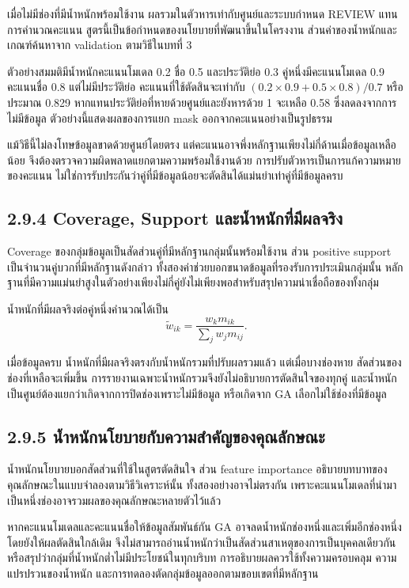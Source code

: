 เมื่อไม่มีช่องที่มีน้ำหนักพร้อมใช้งาน ผลรวมในตัวหารเท่ากับศูนย์และระบบกำหนด REVIEW แทนการคำนวณคะแนน สูตรนี้เป็นข้อกำหนดของนโยบายที่พัฒนาขึ้นในโครงงาน ส่วนค่าของน้ำหนักและเกณฑ์ค้นหาจาก validation ตามวิธีในบทที่ 3

ตัวอย่างสมมติมีน้ำหนักคะแนนโมเดล 0.2 ชื่อ 0.5 และประวัติย่อ 0.3 คู่หนึ่งมีคะแนนโมเดล 0.9 คะแนนชื่อ 0.8 แต่ไม่มีประวัติย่อ คะแนนที่ใช้ตัดสินจะเท่ากับ $(0.2\times0.9+0.5\times0.8)/0.7$ หรือประมาณ 0.829 หากแทนประวัติย่อที่หายด้วยศูนย์และยังหารด้วย 1 จะเหลือ 0.58 ซึ่งลดลงจากการไม่มีข้อมูล ตัวอย่างนี้แสดงผลของการแยก mask ออกจากคะแนนอย่างเป็นรูปธรรม

แม้วิธีนี้ไม่ลงโทษข้อมูลขาดด้วยศูนย์โดยตรง แต่คะแนนอาจพึ่งหลักฐานเพียงไม่กี่ด้านเมื่อข้อมูลเหลือน้อย จึงต้องตรวจความผิดพลาดแยกตามความพร้อมใช้งานด้วย การปรับตัวหารเป็นการแก้ความหมายของคะแนน ไม่ใช่การรับประกันว่าคู่ที่มีข้อมูลน้อยจะตัดสินได้แม่นยำเท่าคู่ที่มีข้อมูลครบ

\subsection*{2.9.4 Coverage, Support และน้ำหนักที่มีผลจริง}
Coverage ของกลุ่มข้อมูลเป็นสัดส่วนคู่ที่มีหลักฐานกลุ่มนั้นพร้อมใช้งาน ส่วน positive support เป็นจำนวนคู่บวกที่มีหลักฐานดังกล่าว ทั้งสองค่าช่วยบอกขนาดข้อมูลที่รองรับการประเมินกลุ่มนั้น หลักฐานที่มีความแม่นยำสูงในตัวอย่างเพียงไม่กี่คู่ยังไม่เพียงพอสำหรับสรุปความน่าเชื่อถือของทั้งกลุ่ม

น้ำหนักที่มีผลจริงต่อคู่หนึ่งคำนวณได้เป็น
\begin{equation*}
\widetilde{w}_{ik}=\frac{w_km_{ik}}{\sum_jw_jm_{ij}}.
\end{equation*}

เมื่อข้อมูลครบ น้ำหนักที่มีผลจริงตรงกับน้ำหนักรวมที่ปรับผลรวมแล้ว แต่เมื่อบางช่องหาย สัดส่วนของช่องที่เหลือจะเพิ่มขึ้น การรายงานเฉพาะน้ำหนักรวมจึงยังไม่อธิบายการตัดสินใจของทุกคู่ และน้ำหนักเป็นศูนย์ต้องแยกว่าเกิดจากการปิดช่องเพราะไม่มีข้อมูล หรือเกิดจาก GA เลือกไม่ใช้ช่องที่มีข้อมูล

\subsection*{2.9.5 น้ำหนักนโยบายกับความสำคัญของคุณลักษณะ}
น้ำหนักนโยบายบอกสัดส่วนที่ใช้ในสูตรตัดสินใจ ส่วน feature importance อธิบายบทบาทของคุณลักษณะในแบบจำลองตามวิธีวิเคราะห์นั้น ทั้งสองอย่างอาจไม่ตรงกัน เพราะคะแนนโมเดลที่นำมาเป็นหนึ่งช่องอาจรวมผลของคุณลักษณะหลายตัวไว้แล้ว

หากคะแนนโมเดลและคะแนนชื่อให้ข้อมูลสัมพันธ์กัน GA อาจลดน้ำหนักช่องหนึ่งและเพิ่มอีกช่องหนึ่งโดยยังให้ผลตัดสินใกล้เดิม จึงไม่สามารถอ่านน้ำหนักว่าเป็นสัดส่วนสาเหตุของการเป็นบุคคลเดียวกัน หรือสรุปว่ากลุ่มที่น้ำหนักต่ำไม่มีประโยชน์ในทุกบริบท การอธิบายผลควรใช้ทั้งความครอบคลุม ความแปรปรวนของน้ำหนัก และการทดลองตัดกลุ่มข้อมูลออกตามขอบเขตที่มีหลักฐาน

